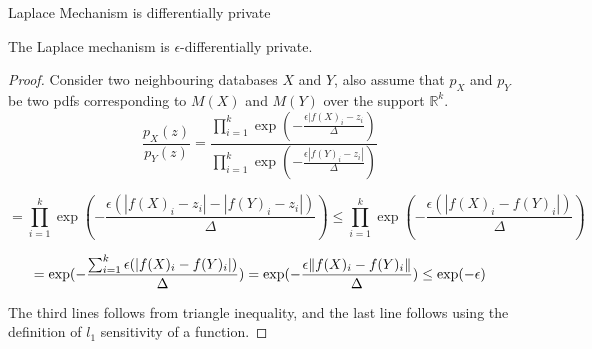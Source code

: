 \documentclass[aspectratio=169]{beamer}
\DeclarePairedDelimiter{\norm}{\lVert}{\rVert}
\begin{document}
\begin{frame}[allowframebreaks]{Laplace Mechanism is differentially private}
\begin{theorem}
\label{th1}
The Laplace mechanism is $\epsilon$-differentially private.
\end{theorem}

\begin{proof}
Consider two neighbouring databases $X$ and $Y$, also assume that $p_X$ and $p_Y$ be two pdfs corresponding to $M(X)$ and $M(Y)$ over the support $\mathbb{R}^k$.
$$\frac{p_X(z)}{p_Y(z)}=\frac{\prod_{i=1}^{k} \exp(- \frac{\epsilon |f(X)_i - z_i}{\Delta})}{\prod_{i=1}^{k} \exp(- \frac{\epsilon |f(Y)_i - z_i|}{\Delta})}$$

$$=\prod_{i=1}^{k} \exp(- \frac{\epsilon (|f(X)_i - z_i| - |f(Y)_i - z_i| )}{\Delta})\leq \prod_{i=1}^{k} \exp(- \frac{\epsilon (|f(X)_i - f(Y)_i| )}{\Delta})$$

$$=\exp(- \frac{\sum_{i=1}^{k} \epsilon (|f(X)_i - f(Y)_i| )}{\Delta})=\exp(- \frac{ \epsilon \norm{f(X)_i - f(Y)_i}}{\Delta})\leq \exp(- \epsilon)$$

The third lines follows from triangle inequality, and the last line follows using the definition of $l_1$ sensitivity of a function.
\end{proof}
\end{frame}
\end{document}
